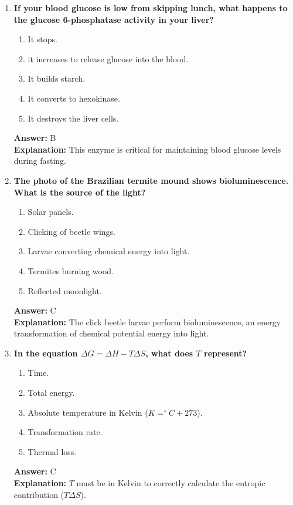 \documentclass[11pt, a4paper]{article}
\begin{document}
\begin{enumerate}[leftmargin=*, label=\arabic*.]
\item \textbf{If your blood glucose is low from skipping lunch, what happens to the glucose 6-phosphatase activity in your liver?}
\begin{enumerate}[label=\Alph*.]
    \item It stops.
    \item it increases to release glucose into the blood.
    \item It builds starch.
    \item It converts to hexokinase.
    \item It destroys the liver cells.
\end{enumerate}
\textbf{Answer:} B \\
\textbf{Explanation:} This enzyme is critical for maintaining blood glucose levels during fasting.

\item \textbf{The photo of the Brazilian termite mound shows bioluminescence. What is the source of the light?}
\begin{enumerate}[label=\Alph*.]
    \item Solar panels.
    \item Clicking of beetle wings.
    \item Larvae converting chemical energy into light.
    \item Termites burning wood.
    \item Reflected moonlight.
\end{enumerate}
\textbf{Answer:} C \\
\textbf{Explanation:} The click beetle larvae perform bioluminescence, an energy transformation of chemical potential energy into light.

\item \textbf{In the equation $\Delta G = \Delta H - T \Delta S$, what does $T$ represent?}
\begin{enumerate}[label=\Alph*.]
    \item Time.
    \item Total energy.
    \item Absolute temperature in Kelvin ($K = ^\circ C + 273$).
    \item Transformation rate.
    \item Thermal loss.
\end{enumerate}
\textbf{Answer:} C \\
\textbf{Explanation:} $T$ must be in Kelvin to correctly calculate the entropic contribution ($T \Delta S$).


\end{enumerate}
\end{document}

